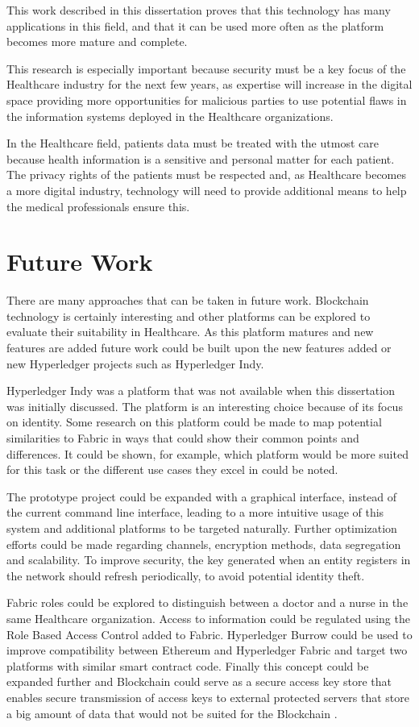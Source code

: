 This work described in this dissertation proves that this technology has many
applications in this field, and that it can be used more often as the platform
becomes more mature and complete.

This research is especially important because security must be a key focus of
the Healthcare industry for the next few years, as expertise will increase in
the digital space providing more opportunities for malicious parties to use
potential flaws in the information systems deployed in the Healthcare
organizations.

In the Healthcare field, patients data must be treated with the utmost care
because health information is a sensitive and personal matter for each patient.
The privacy rights of the patients must be respected and, as Healthcare becomes
a more digital industry, technology will need to provide additional means to
help the medical professionals ensure this.

\section{Future Work} \label{futureWork}

There are many approaches that can be taken in future work. Blockchain
technology is certainly interesting and other platforms can be explored to
evaluate their suitability in Healthcare. As this platform matures and new
features are added future work could be built upon the new features added or
new Hyperledger projects such as Hyperledger Indy. 

Hyperledger Indy was a platform that was not available when this dissertation
was initially discussed. The platform is an interesting choice because of its
focus on identity. Some research on this platform could be made to map
potential similarities to Fabric in ways that could show their common points
and differences. It could be shown, for example, which platform would be more
suited for this task or the different use cases they excel in could be noted.

The prototype project could be expanded with a graphical interface, instead of
the current command line interface, leading to a more intuitive usage of this
system and additional platforms to be targeted naturally. Further optimization
efforts could be made regarding channels, encryption methods, data segregation
and scalability. To improve security, the key generated when an entity
registers in the network should refresh periodically, to avoid potential
identity theft.

Fabric roles could be explored to distinguish between a doctor and a nurse in
the same Healthcare organization.  Access to information could be regulated
using the Role Based Access Control added to Fabric.  Hyperledger Burrow could
be used to improve compatibility between Ethereum and Hyperledger Fabric and
target two platforms with similar smart contract code.  Finally this concept
could be expanded further and Blockchain could serve as a secure access key
store that enables secure transmission of access keys to external protected
servers that store a big amount of data that would not be suited for the
Blockchain .
